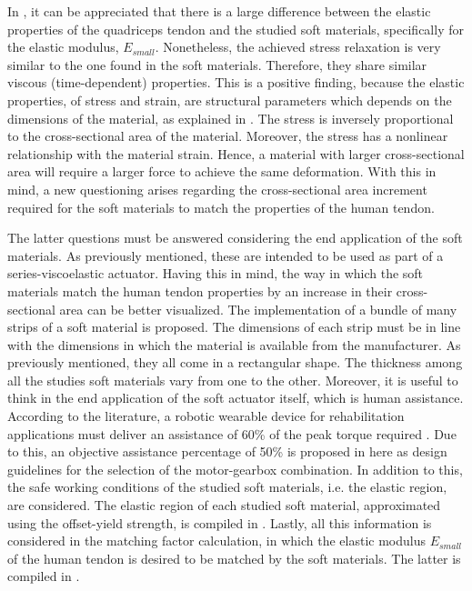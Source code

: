 In , it can be appreciated that there is a large difference between the elastic properties of the quadriceps tendon and the studied soft materials, specifically for the elastic modulus, $E_{small}$. Nonetheless, the achieved stress relaxation is very similar to the one found in the soft materials. Therefore, they share similar viscous (time-dependent) properties. This is a positive finding, because the elastic properties, of stress and strain, are structural parameters which depends on the dimensions of the material, as explained in . The stress is inversely proportional to the cross-sectional area of the material. Moreover, the stress has a nonlinear relationship with the material strain. Hence, a material with larger cross-sectional area will require a larger force to achieve the same deformation. With this in mind, a new questioning arises regarding the cross-sectional area increment required for the soft materials to match the properties of the human tendon.

The latter questions must be answered considering the end application of the soft materials. As previously mentioned, these are intended to be used as part of a series-viscoelastic actuator. Having this in mind, the way in which the soft materials match the human tendon properties by an increase in their cross-sectional area can be better visualized. The implementation of a bundle of many strips of a soft material is proposed. The dimensions of each strip must be in line with the dimensions in which the material is available from the manufacturer. As previously mentioned, they all come in a rectangular shape. The thickness among all the studies soft materials vary from one to the other. Moreover, it is useful to think in the end application of the soft actuator itself, which is human assistance. According to the literature, a robotic wearable device for rehabilitation applications must deliver an assistance of 60\% of the peak torque required \cite{dos2014impedance}. Due to this, an objective assistance percentage of 50\% is proposed in here as design guidelines for the selection of the motor-gearbox combination. In addition to this, the safe working conditions of the studied soft materials, i.e. the elastic region, are considered. The elastic region of each studied soft material, approximated using the offset-yield strength, is compiled in . Lastly, all this information is considered in the matching factor calculation, in which the elastic modulus $E_{small}$ of the human tendon is desired to be matched by the soft materials. The latter is compiled in . 

